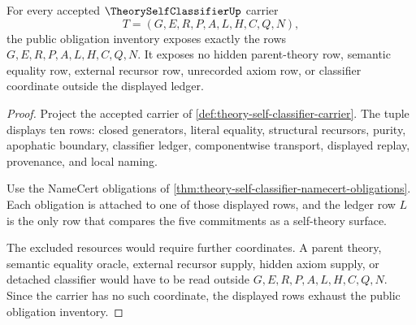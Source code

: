 \begin{theorem}
\label{thm:theory-self-classifier-obligation-row-exhaustion}
For every accepted $\TheorySelfClassifierUp$ carrier
$$
T=(G,E,R,P,A,L,H,C,Q,N),
$$
the public obligation inventory exposes exactly the rows $G,E,R,P,A,L,H,C,Q,N$. It exposes no hidden parent-theory row, semantic equality row, external recursor row, unrecorded axiom row, or classifier coordinate outside the displayed ledger.
\end{theorem}
\begin{proof}
Project the accepted carrier of \autoref{def:theory-self-classifier-carrier}. The tuple displays ten rows: closed generators, literal equality, structural recursors, purity, apophatic boundary, classifier ledger, componentwise transport, displayed replay, provenance, and local naming.

Use the NameCert obligations of \autoref{thm:theory-self-classifier-namecert-obligations}. Each obligation is attached to one of those displayed rows, and the ledger row $L$ is the only row that compares the five commitments as a self-theory surface.

The excluded resources would require further coordinates. A parent theory, semantic equality oracle, external recursor supply, hidden axiom supply, or detached classifier would have to be read outside $G,E,R,P,A,L,H,C,Q,N$. Since the carrier has no such coordinate, the displayed rows exhaust the public obligation inventory.
\end{proof}

